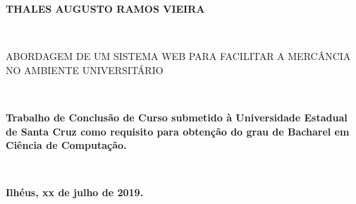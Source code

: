 
%
% 
%
\begin{folhadeaprovacao}


\begin{center}

    {\large \begin{large} \bfseries THALES AUGUSTO RAMOS VIEIRA \end{large}\\}
    \vspace{4cm}
    {\large\bfseries{\begin{large}ABORDAGEM DE UM SISTEMA WEB PARA FACILITAR A MERCÂNCIA NO AMBIENTE UNIVERSITÁRIO \end{large}}\\}
    \vspace{1cm}
    \hspace{.45\linewidth}
    \begin{minipage}{.50\linewidth}

            \textbf{Trabalho de Conclusão de Curso submetido à Universidade Estadual de Santa Cruz  como requisito para obtenção do grau de Bacharel em Ciência de Computação. }
    \end{minipage}
    \\
\end{center}
    \textbf{Ilhéus, xx de julho de 2019.}
\begin{center}
           

    \bfseries{}
\end{center}


    \vspace{2.5cm}
    \vspace{3 cm}%

  
\end{folhadeaprovacao}